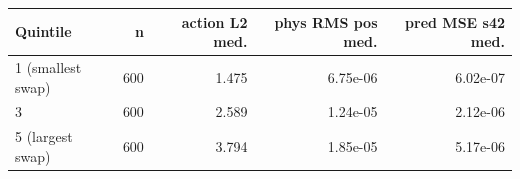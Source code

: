 
\begin{tabular}{lrrrr}
\toprule
Quintile & n & action L2 med. & phys RMS pos med. & pred MSE s42 med. \\
\midrule
1 (smallest swap) & 600 & 1.475 & 6.75e-06 & 6.02e-07 \\
3 & 600 & 2.589 & 1.24e-05 & 2.12e-06 \\
5 (largest swap) & 600 & 3.794 & 1.85e-05 & 5.17e-06 \\
\bottomrule
\end{tabular}
